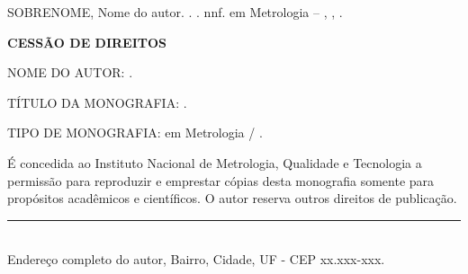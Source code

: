 \begin{fichacatalografica}
\begin{flushleft}
SOBRENOME, Nome do autor. \imprimirtitulo. \imprimirdata. nnf. \imprimirtipotrabalho em Metrologia – \imprimirinstituicao, \imprimirlocal, \imprimirdata.
	
\vspace*{\fill}		
	
{\bfseries CESSÃO DE DIREITOS}

NOME DO AUTOR: \imprimirautor.

TÍTULO DA MONOGRAFIA: \imprimirtitulo.

TIPO DE MONOGRAFIA: \imprimirtipotrabalho em Metrologia / \imprimirdata.


É concedida ao Instituto Nacional de Metrologia, Qualidade e Tecnologia a permissão para reproduzir e emprestar cópias desta monografia somente para propósitos acadêmicos e científicos. O autor reserva outros direitos de publicação.
\vspace*{\fill}	

	\rule[-2cm]{3in}{0.1pt}
	
	\imprimirautor\\
	Endereço completo do autor, Bairro, Cidade, UF - CEP xx.xxx-xxx.
	
	\end{flushleft}
\end{fichacatalografica}